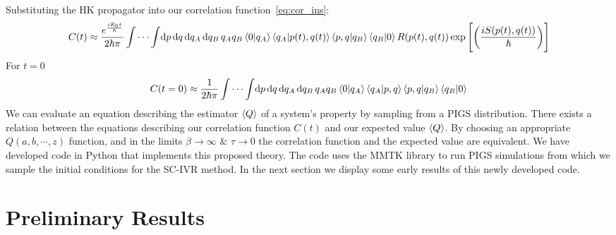 \documentclass[12pt,letterpaper,oneside,final,titlepage]{article}               %
\numberwithin{equation}{section} %
\newcommand{\expb}[1]{\ensuremath{\exp{\left[ #1 \right]}}}
\begin{document}
Substituting the HK propagator into our correlation function~\eqref{eq:cor_ins}:
\begin{equation*}
    C(t) \approx \frac{e^{\frac{iE_{0}t}{\hbar}}}{2\hbar\pi}\int\cdots\int\! \dif p\,\!\dif q\,\!\dif q_{A}\,\!\dif q_{B}\,
    q_{A}q_{B}\braket{0|q_{A}}\braket{q_{A}|p(t), q(t)} \braket{p,q|q_{B}}\braket{q_{B}|0}
    R(p(t),q(t)) \expb{\left(\frac{iS(p(t),q(t))}{\hbar}\right)}
\end{equation*}
For $t=0$
\begin{equation*}
    C(t=0) \approx \frac{1}{2\hbar\pi}\int\cdots\int\! \dif p\,\!\dif q\,\!\dif q_{A}\,\!\dif q_{B}\,
    q_{A}q_{B}\braket{0|q_{A}}\braket{q_{A}|p, q} \braket{p,q|q_{B}}\braket{q_{B}|0}
\end{equation*}
We can evaluate an equation describing the estimator $\braket{Q}$ of a system's property by sampling from a PIGS distribution.
There exists a relation between the equations describing our correlation function $C(t)$ and our expected value $\braket{Q}$.
By choosing an appropriate $Q(a,b,\cdots, z)$ function, and in the limits $\beta \to \infty$ \& $\tau \to 0$ 
the correlation function and the expected value are equivalent.
We have developed code in Python that implements this proposed theory. 
The code uses the MMTK library to run PIGS simulations from which we sample the initial conditions for the SC-IVR method. 
In the next section we display some early results of this newly developed code.

\section{Preliminary Results}
\end{document}
